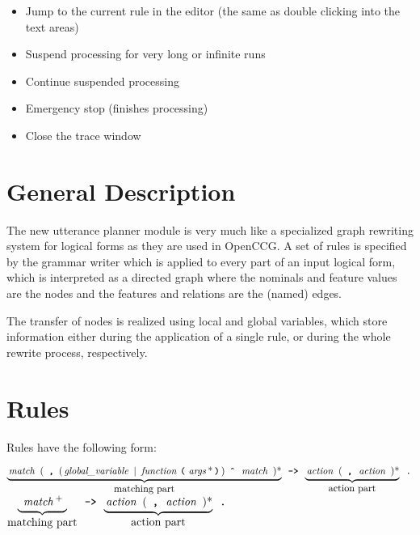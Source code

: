 \documentclass[11pt,a4paper]{article}
\begin{document}
\begin{itemize}\addtolength{\itemsep}{-.33\itemsep}
\item Jump to the current rule in the editor (the same as double clicking into
  the text areas)
\item Suspend processing for very long or infinite runs
\item Continue suspended processing
\item Emergency stop (finishes processing)
\item Close the trace window
\end{itemize}

\newpage
\section{General Description}
The new utterance planner module is very much like a specialized graph
rewriting system for logical forms as they are used in OpenCCG. A set of
rules is specified by the grammar writer which is applied to every part of
an input logical form, which is interpreted as a directed graph where the
nominals and feature values are the nodes and the features and relations are
the (named) edges.

The transfer of nodes is realized using local and global variables, which
store information either during the application of a single rule, or during
the whole rewrite process, respectively.

\section{Rules}

Rules have the following form:

\newcommand{\nt}[1]{\,\mbox{\emph{#1}}\,}
\newcommand{\tok}[1]{\,\mbox{\texttt{\textbf{#1}}}\,}
\newcommand{\id}{\,\mbox{\texttt{ID}}\,}
\newcommand{\BAR}{\,|\,}
\begin{center}

$\underbrace{\mbox{\nt{match} ( \tok{,}
    (\nt{global\_variable} \mbox{\textbar}\ \nt{function}\tok{(}\nt{args}*\tok{)})
    \tok{\^} \nt{match} )*}}_{\mbox{matching part}} \mbox{\ \tok{->}\ }
\underbrace{\mbox{\nt{action} ( \tok{,} \nt{action} )*}}_{\mbox{action
    part}} \mbox{\ \tok{.}}$
\fi
$\underbrace{\rule[-.5ex]{0pt}{1ex}\ \nt{match}^{+}\ }_{\mbox{matching part}} \mbox{\ \tok{->}\ }
\underbrace{\mbox{\nt{action} ( \tok{,} \nt{action} )*}}_{\mbox{action
    part}} \mbox{\ \tok{.}}$
\end{center}
\end{document}
